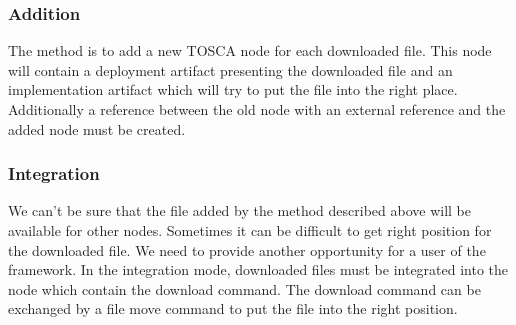\subsubsection*{Addition}
The method is to add a new TOSCA node for each downloaded file.
This node will contain a deployment artifact presenting the downloaded file and an implementation artifact which will try to put the file into the right place.
Additionally a reference between the old node with an external reference and the added node must be created.

\subsubsection{Integration}
We can't be sure that the file added by the method described above will be available for other nodes.
Sometimes it can be difficult to get right position for the downloaded file. %
We need to provide another opportunity for a user of the framework.
In the integration mode, downloaded files must be integrated into the node which contain the download command.
The download command can be exchanged by a file move command to put the file into the right position.

